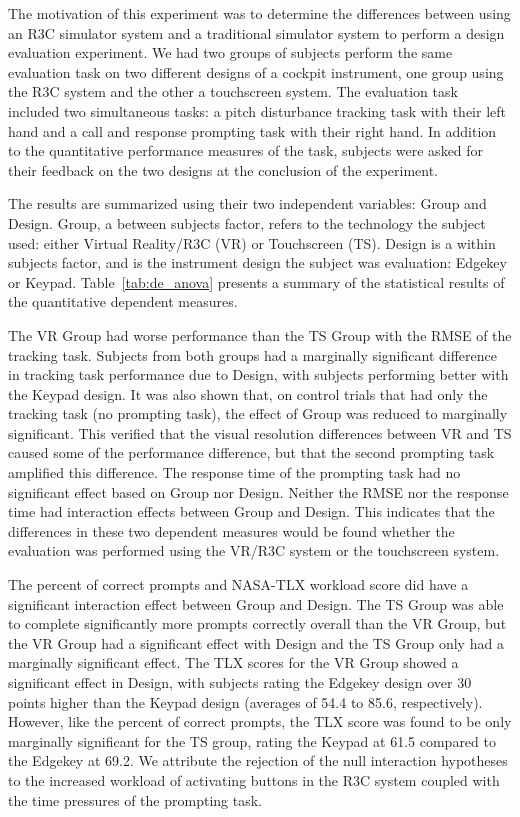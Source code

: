 The motivation of this experiment was to determine the differences between using an R3C simulator system and a traditional simulator system to perform a design evaluation experiment.
We had two groups of subjects perform the same evaluation task on two different designs of a cockpit instrument, one group using the R3C system and the other a touchscreen system.
The evaluation task included two simultaneous tasks: a pitch disturbance tracking task with their left hand and a call and response prompting task with their right hand.
In addition to the quantitative performance measures of the task, subjects were asked for their feedback on the two designs at the conclusion of the experiment.

The results are summarized using their two independent variables: Group and Design.
Group, a between subjects factor, refers to the technology the subject used: either Virtual Reality/R3C (VR) or Touchscreen (TS).
Design is a within subjects factor, and is the instrument design the subject was evaluation: Edgekey or Keypad.
Table~\ref{tab:de_anova} presents a summary of the statistical results of the quantitative dependent measures.

The VR Group had worse performance than the TS Group with the RMSE of the tracking task.
Subjects from both groups had a marginally significant difference in tracking task performance due to Design, with subjects performing better with the Keypad design.
It was also shown that, on control trials that had only the tracking task (no prompting task), the effect of Group was reduced to marginally significant.
This verified that the visual resolution differences between VR and TS caused some of the performance difference, but that the second prompting task amplified this difference.
The response time of the prompting task had no significant effect based on Group nor Design.
Neither the RMSE nor the response time had interaction effects between Group and Design.
This indicates that the differences in these two dependent measures would be found whether the evaluation was performed using the VR/R3C system or the touchscreen system.

The percent of correct prompts and NASA-TLX workload score did have a significant interaction effect between Group and Design.
The TS Group was able to complete significantly more prompts correctly overall than the VR Group, but the VR Group had a significant effect with Design and the TS Group only had a marginally significant effect.
The TLX scores for the VR Group showed a significant effect in Design, with subjects rating the Edgekey design over 30 points higher than the Keypad design (averages of 54.4 to 85.6, respectively).
However, like the percent of correct prompts, the TLX score was found to be only marginally significant for the TS group, rating the Keypad at 61.5 compared to the Edgekey at 69.2.
We attribute the rejection of the null interaction hypotheses to the increased workload of activating buttons in the R3C system coupled with the time pressures of the prompting task.

